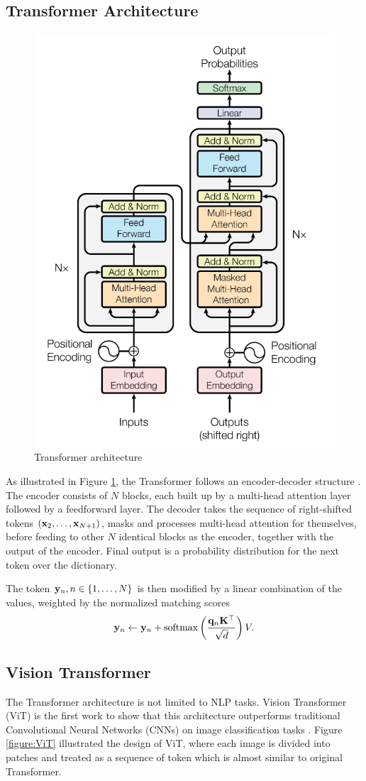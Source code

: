 \subsection{Transformer Architecture}
\begin{figure}[ht]
  \centering
  \includegraphics[width=0.5\linewidth]{img/transfomer.png}
  \vspace{0.5cm}
  \caption[Transformer architecture]{Transformer architecture \cite{vaswani2017attention}}
  \label{figure:transformer-architecture}
\end{figure}

As illustrated in Figure \ref{figure:transformer-architecture}, the Transformer follows an encoder-decoder structure \cite{cho2014learning}. The encoder consists of $N$ blocks, each built up by a multi-head attention layer followed by a feedforward layer. The decoder takes the sequence of right-shifted tokens $(\mathbf{x}_2,\ldots, \mathbf{x}_{N+1})$, masks and processes multi-head attention for themselves, before feeding to other $N$ identical blocks as the encoder, together with the output of the encoder. Final output is a probability distribution for the next token over the dictionary.

The token $\mathbf{y}_n, n\in\{1,\ldots,N\}$ is then modified by a linear combination of the values, weighted by the normalized matching scores
$$\mathbf{y}_n \leftarrow \mathbf{y}_n + \mathrm{softmax}\left(\dfrac{\mathbf{q}_n\mathbf{K}^\top}{\sqrt{d}}\right)V.$$

\subsection{Vision Transformer}
The Transformer architecture is not limited to NLP tasks. Vision Transformer (ViT) is the first work to show that this architecture outperforms traditional Convolutional Neural Networks (CNNs) on image classification tasks \cite{dosovitskiy2020image}. Figure \ref{figure:ViT} illustrated the design of ViT, where each image is divided into patches and treated as a sequence of token which is almost similar to original Transformer.

